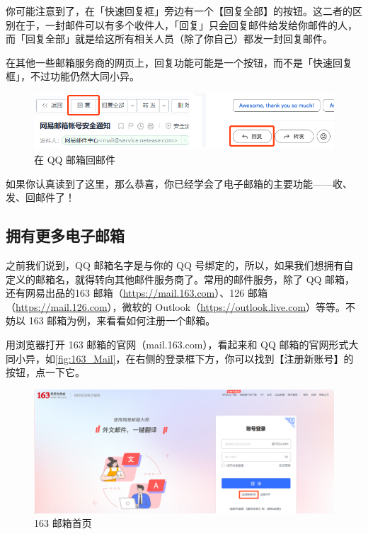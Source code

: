 \begin{note}
  你可能注意到了，在「快速回复框」旁边有一个【回复全部】的按钮。这二者的区别在于，一封邮件可以有多个收件人，「回复」只会回复邮件给发给你邮件的人，而「回复全部」就是给这所有相关人员（除了你自己）都发一封回复邮件。
\end{note}

在其他一些邮箱服务商的网页上，回复功能可能是一个按钮，而不是「快速回复框」，不过功能仍然大同小异。

\begin{figure}[htb!]
  \centering
  \includegraphics[width=.7\textwidth]{assets/software/Reply_Buttons.png}
  \caption{在 QQ 邮箱回邮件}
  \label{fig:Reply_Buttons}
\end{figure}

如果你认真读到了这里，那么恭喜，你已经学会了电子邮箱的主要功能——收、发、回邮件了！

\subsection{拥有更多电子邮箱}

之前我们说到，QQ 邮箱名字是与你的 QQ 号绑定的，所以，如果我们想拥有自定义的邮箱名，就得转向其他邮件服务商了。常用的邮件服务，除了 QQ 邮箱，还有网易出品的163 邮箱（\url{https://mail.163.com}）、126 邮箱（\url{https://mail.126.com}），微软的 Outlook（\url{https://outlook.live.com}）等等。不妨以 163 邮箱为例，来看看如何注册一个邮箱。

用浏览器打开 163 邮箱的官网（mail.163.com），看起来和 QQ 邮箱的官网形式大同小异，如\autoref{fig:163_Mail}，在右侧的登录框下方，你可以找到【注册新账号】的按钮，点一下它。

\begin{figure}[htb!]
  \centering
  \includegraphics[width=.8\textwidth]{assets/software/163_Mail.png}
  \caption{163 邮箱首页}
  \label{fig:163_Mail}
\end{figure}

